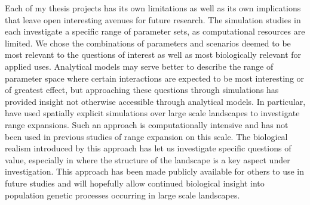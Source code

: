 Each of my thesis projects has its own limitations as well as its own implications that leave open interesting avenues for future research. 
The simulation studies in  each investigate a specific range of parameter sets, as computational resources are limited. We chose the combinations of parameters and scenarios deemed to be most relevant to the questions of interest as well as most biologically relevant for applied uses. Analytical models may serve better to describe the range of parameter space where certain interactions are expected to be most interesting or of greatest effect, but approaching these questions through simulations has provided insight not otherwise accessible through analytical models. In particular,  have used spatially explicit simulations over large scale landscapes to investigate range expansions. Such an approach is computationally intensive and has not been used in previous studies of range expansion on this scale. The biological realism introduced by this approach has let us investigate specific questions of value, especially in  where the structure of the landscape is a key aspect under investigation. This approach has been made publicly available for others to use in future studies and will hopefully allow continued biological insight into population genetic processes occurring in large scale landscapes.

